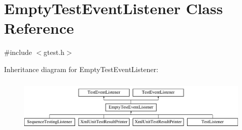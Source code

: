 \hypertarget{classtesting_1_1EmptyTestEventListener}{\section{\-Empty\-Test\-Event\-Listener \-Class \-Reference}
\label{d6/d86/classtesting_1_1EmptyTestEventListener}
}


{\ttfamily \#include $<$gtest.\-h$>$}

\-Inheritance diagram for \-Empty\-Test\-Event\-Listener\-:\begin{figure}[H]
\begin{center}
\leavevmode
\includegraphics[height=2.608696cm]{d6/d86/classtesting_1_1EmptyTestEventListener}
\end{center}
\end{figure}
